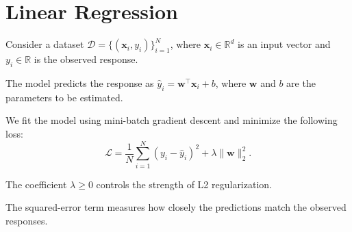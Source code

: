 \documentclass[11pt]{article}
\begin{document}
\section{Linear Regression}

Consider a dataset $\mathcal{D}=\{(\mathbf{x}_i,y_i)\}_{i=1}^{N}$,
where $\mathbf{x}_i \in \mathbb{R}^{d}$ is an input vector and
$y_i \in \mathbb{R}$ is the observed response.

The model predicts the response as
$\hat{y}_i=\mathbf{w}^{\top}\mathbf{x}_i+b$,
where $\mathbf{w}$ and $b$ are the parameters to be estimated.

We fit the model using mini-batch gradient descent and minimize
the following loss:
\[
\mathcal{L}
= \frac{1}{N}\sum_{i=1}^{N}
\left(y_i-\hat{y}_i\right)^2
+ \lambda\|\mathbf{w}\|_2^2.
\]

The coefficient $\lambda \geq 0$ controls the strength of L2 regularization.

The squared-error term measures how closely the predictions match
the observed responses.
\end{document}
